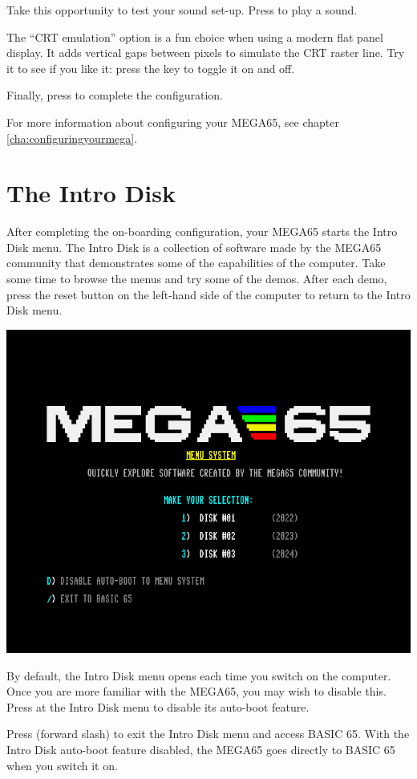 Take this opportunity to test your sound set-up. Press  to play a sound.

The ``CRT emulation'' option is a fun choice when using a modern flat panel display. It adds vertical gaps between pixels to simulate the CRT raster line. Try it to see if you like it: press the  key to toggle it on and off.

Finally, press  to complete the configuration.

For more information about configuring your MEGA65, see chapter \vref{cha:configuringyourmega}.

\section{The Intro Disk}

After completing the on-boarding configuration, your MEGA65 starts the Intro Disk menu. The Intro Disk is a collection of software made by the MEGA65 community that demonstrates some of the capabilities of the computer. Take some time to browse the menus and try some of the demos. After each demo, press the reset button on the left-hand side of the computer to return to the Intro Disk menu.

\begin{center}
  \includegraphics[width=0.7\linewidth]{images/demo_title.png}
\end{center}

By default, the Intro Disk menu opens each time you switch on the computer. Once you are more familiar with the MEGA65, you may wish to disable this. Press  at the Intro Disk menu to disable its auto-boot feature.

Press \megakey{/} (forward slash) to exit the Intro Disk menu and access BASIC 65. With the Intro Disk auto-boot feature disabled, the MEGA65 goes directly to BASIC 65 when you switch it on.

